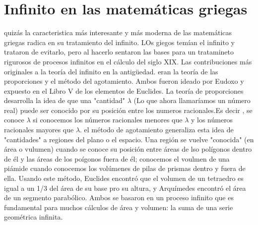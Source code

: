 \documentclass{book}
\begin{document}
\chapter{Infinito en las matemáticas griegas}
    quizás la caracteristica más interesante y más moderna de las matemáticas griegas radica en su tratamiento del infinito. LOs giegos temían el infinito y trataron de evitarlo, pero 
    al hacerlo sentaron las bases para un tratamineto rigurosos de procesos infinitos en el cálculo del siglo XIX.
    Las contribuciones más originales a la teoría del infinito en la antigüedad.
    eran la teoría de las proporciones y el método del agotamiento. 
    Ambos fueron ideado por Eudoxo y expuesto en el Libro V de los elementos de Euclides.
    La teoría de proporciones desarrolla la idea de que una "cantidad" $\lambda$ (Lo que ahora llamaríamos un número real)
    puede ser conocido por su posición entre los numeros racionales.Es decir , se conoce $\lambda$ si conocemos los números racionales menores que $\lambda$ 
    y los números racionales mayores que $\lambda$. el método de agotamiento generaliza esta idea de "cantidades" a regiones del plano o el espacio.
    Una región se vuelve "conocida" (en área o vulumen) cuando se conoce su posición entre áreas de lso polígonos dentro de él y las áreas de los poígonos fuera de él;
    conocemos el voulmen de una piámide cuando conocemos los volúmenes de pilas de prismas dentro y fuera de ella.
    Usando este método, Euclides encontró que el volumen de un tetraedro es igual a un 1/3 del área de su base pro su altura, y Arquímedes encontró el área de un segmento parabólico. Ambos se basaron en un proceso infinito que es fundamental para muchos cálculos de área y volumen: 
    la suma de una serie geométrica infinita. 
\end{document}
